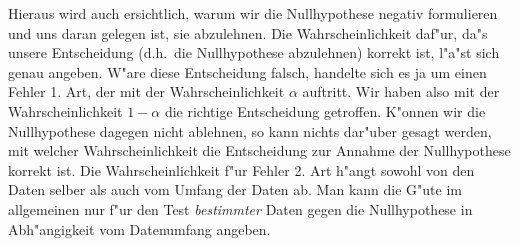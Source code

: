 



Hieraus wird auch ersichtlich, warum wir die Nullhypothese negativ formulieren und uns
daran gelegen ist, sie abzulehnen.  Die Wahrscheinlichkeit daf"ur, da"s unsere
Entscheidung (d.h.\  die Nullhypothese abzulehnen) korrekt ist, l"a"st sich genau angeben. W"are diese Entscheidung falsch,
handelte sich es ja um einen Fehler 1. Art, der mit der Wahrscheinlichkeit $\alpha$
auftritt. Wir haben also mit der Wahrscheinlichkeit $1-\alpha$ die richtige Entscheidung
getroffen.  K"onnen wir die Nullhypothese dagegen nicht ablehnen, so kann nichts dar"uber
gesagt werden, mit welcher Wahrscheinlichkeit die Entscheidung zur Annahme der
Nullhypothese korrekt ist. Die Wahrscheinlichkeit f"ur Fehler 2. Art h"angt sowohl von den
Daten selber als auch vom Umfang der Daten ab. Man kann die G"ute im allgemeinen nur f"ur den
Test {\em bestimmter} Daten gegen die Nullhypothese in Abh"angigkeit vom Datenumfang
angeben.


